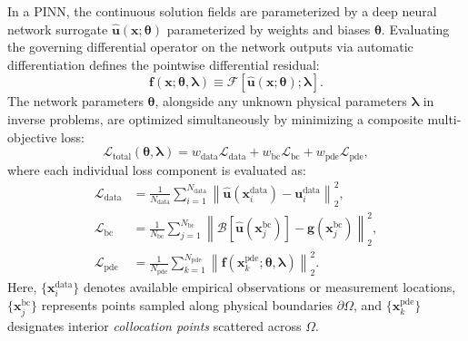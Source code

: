 In a PINN, the continuous solution fields are parameterized by a deep neural network surrogate $\hat{\boldsymbol{u}}(\boldsymbol{x}; \boldsymbol{\theta})$ parameterized by weights and biases $\boldsymbol{\theta}$. Evaluating the governing differential operator on the network outputs via automatic differentiation defines the pointwise differential residual:
\begin{equation}
    \boldsymbol{f}(\boldsymbol{x}; \boldsymbol{\theta}, \boldsymbol{\lambda}) \equiv \mathcal{F}[\hat{\boldsymbol{u}}(\boldsymbol{x}; \boldsymbol{\theta}); \boldsymbol{\lambda}] .
    \label{eq:pde_residual_def}
\end{equation}
The network parameters $\boldsymbol{\theta}$, alongside any unknown physical parameters $\boldsymbol{\lambda}$ in inverse problems, are optimized simultaneously by minimizing a composite multi-objective loss:
\begin{equation}
    \mathcal{L}_{\mathrm{total}}(\boldsymbol{\theta}, \boldsymbol{\lambda}) = w_{\mathrm{data}} \mathcal{L}_{\mathrm{data}} + w_{\mathrm{bc}} \mathcal{L}_{\mathrm{bc}} + w_{\mathrm{pde}} \mathcal{L}_{\mathrm{pde}} ,
    \label{eq:composite_loss_pinn}
\end{equation}
where each individual loss component is evaluated as:
\begin{align}
    \mathcal{L}_{\mathrm{data}} &= \frac{1}{N_{\mathrm{data}}} \sum_{i=1}^{N_{\mathrm{data}}} \left\| \hat{\boldsymbol{u}}(\boldsymbol{x}_i^{\mathrm{data}}) - \boldsymbol{u}_i^{\mathrm{data}} \right\|_2^2 , \label{eq:loss_data_comp} \\
    \mathcal{L}_{\mathrm{bc}} &= \frac{1}{N_{\mathrm{bc}}} \sum_{j=1}^{N_{\mathrm{bc}}} \left\| \mathcal{B}[\hat{\boldsymbol{u}}(\boldsymbol{x}_j^{\mathrm{bc}})] - \boldsymbol{g}(\boldsymbol{x}_j^{\mathrm{bc}}) \right\|_2^2 , \label{eq:loss_bc_comp} \\
    \mathcal{L}_{\mathrm{pde}} &= \frac{1}{N_{\mathrm{pde}}} \sum_{k=1}^{N_{\mathrm{pde}}} \left\| \boldsymbol{f}(\boldsymbol{x}_k^{\mathrm{pde}}; \boldsymbol{\theta}, \boldsymbol{\lambda}) \right\|_2^2 . \label{eq:loss_pde_comp}
\end{align}
Here, $\{ \boldsymbol{x}_i^{\mathrm{data}} \}$ denotes available empirical observations or measurement locations,
$\{ \boldsymbol{x}_j^{\mathrm{bc}} \}$ represents points sampled along physical boundaries $\partial \Omega$,
and $\{ \boldsymbol{x}_k^{\mathrm{pde}} \}$ designates interior \textit{collocation points} scattered across $\Omega$.

